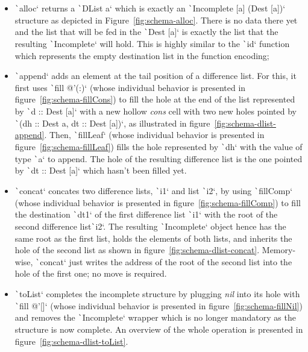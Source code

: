 \documentclass[english]{jflart}
\begin{document}
\begin{itemize}
  \item \texttt`alloc` returns a
    \texttt`DList a` which is exactly an
    \texttt`Incomplete [a] (Dest [a])` structure as
    depicted in Figure~\ref{fig:schema-alloc}. There is no data
    there yet and the list that will be fed in the
    \texttt`Dest [a]` is exactly the list that the
    resulting \texttt`Incomplete` will hold. This is
    highly similar to the \texttt`id` function which
    represents the empty destination list in the function encoding;
    

  \item \texttt`append` adds an element at the tail
    position of a difference list. For this, it first uses
    \texttt`fill @'(:)` (whose individual behavior is presented in figure~\ref{fig:schema-fillCons}) to fill the hole at the end of the list represented by 
    \texttt`d :: Dest [a]` with a new hollow \emph{cons}
    cell with two new holes pointed by \texttt`(dh :: Dest a, dt :: Dest [a])`, as illustrated in figure~\ref{fig:schema-dlist-append}. Then,
    \texttt`fillLeaf` (whose individual behavior is presented in figure~\ref{fig:schema-fillLeaf}) fills the hole represented by
    \texttt`dh` with the value
    of type \texttt`a`
    to append. The hole of the resulting difference list is the one pointed by \texttt`dt :: Dest [a]` which hasn't been filled yet.

  \item \texttt`concat` concates two difference lists,
    \texttt`i1` and list \texttt`i2`, by
    using \texttt`fillComp` (whose individual behavior is presented in figure~\ref{fig:schema-fillComp}) to fill the destination \texttt`dt1`
    of the first difference list \texttt`i1` with the
    root of the second difference list\texttt`i2`. The resulting \texttt`Incomplete`
    object hence has the same root as the first list, holds the
    elements of both lists, and inherits the hole of the second list as shown in figure~\ref{fig:schema-dlist-concat}. Memory-wise,
    \texttt`concat` just writes the address of the root
    of the second list into the hole of the first one; no move is
    required.

  \item \texttt`toList` completes the incomplete structure by plugging \emph{nil} into its hole with \texttt`fill @'[]` (whose individual behavior is presented in figure~\ref{fig:schema-fillNil}) and removes the \texttt`Incomplete` wrapper which is no longer mandatory as the structure is now complete. An overview of the whole operation is presented in figure~\ref{fig:schema-dlist-toList}.
\end{itemize}
\end{document}
